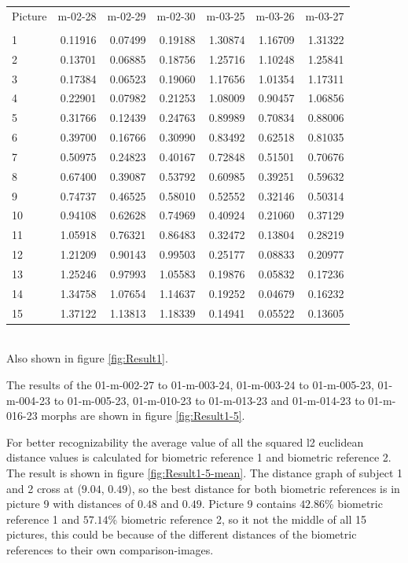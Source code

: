 \begin{tabular}{lrrrrrr}
	Picture & m-02-28 & m-02-29 & m-02-30 & m-03-25 & m-03-26 & m-03-27\\
	 & & & & & & \\
	1 & 0.11916 & 0.07499 & 0.19188 & 1.30874 & 1.16709 & 1.31322\\
	2 & 0.13701 & 0.06885 & 0.18756 & 1.25716 & 1.10248 & 1.25841\\ 
	3 & 0.17384 & 0.06523 & 0.19060 & 1.17656 & 1.01354 & 1.17311\\ 
	4 & 0.22901 & 0.07982 & 0.21253 & 1.08009 & 0.90457 & 1.06856\\ 
	5 & 0.31766 & 0.12439 & 0.24763 & 0.89989 & 0.70834 & 0.88006\\ 
	6 & 0.39700 & 0.16766 & 0.30990 & 0.83492 & 0.62518 & 0.81035\\ 
	7 & 0.50975 & 0.24823 & 0.40167 & 0.72848 & 0.51501 & 0.70676\\ 
	8 & 0.67400 & 0.39087 & 0.53792 & 0.60985 & 0.39251 & 0.59632\\ 
	9 & 0.74737 & 0.46525 & 0.58010 & 0.52552 & 0.32146 & 0.50314\\ 
	10 & 0.94108 & 0.62628 & 0.74969 & 0.40924 & 0.21060 & 0.37129\\ 
	11 & 1.05918 & 0.76321 & 0.86483 & 0.32472 & 0.13804 & 0.28219\\ 
	12 & 1.21209 & 0.90143 & 0.99503 & 0.25177 & 0.08833 & 0.20977\\ 
	13 & 1.25246 & 0.97993 & 1.05583 & 0.19876 & 0.05832 & 0.17236\\ 
	14 & 1.34758 & 1.07654 & 1.14637 & 0.19252 & 0.04679 & 0.16232\\ 
	15 & 1.37122 & 1.13813 & 1.18339 & 0.14941 & 0.05522 & 0.13605\\ 
\end{tabular}\\

Also shown in figure \ref{fig:Result1}.

The results of the 01-m-002-27 to 01-m-003-24, 01-m-003-24 to 01-m-005-23, 01-m-004-23 to 01-m-005-23, 01-m-010-23 to 01-m-013-23 and 01-m-014-23 to 01-m-016-23 morphs are shown in figure \ref{fig:Result1-5}.

For better recognizability the average value of all the squared l2 euclidean distance values is calculated for biometric reference 1 and biometric reference 2. The result is shown in figure \ref{fig:Result1-5-mean}. The distance graph of subject 1 and 2 cross at ($9.04$, $0.49$), so the best distance for both biometric references is in picture 9 with distances of $0.48$ and $0.49$. Picture 9 contains $42.86$\% biometric reference 1 and $57.14$\% biometric reference 2, so it not the middle of all 15 pictures, this could be because of the different distances of the biometric references to their own comparison-images.


